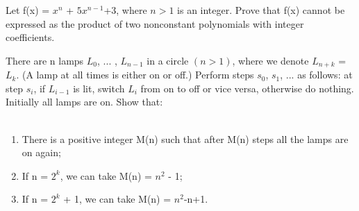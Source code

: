 
\item  Let f(x) = $x^n$ + $5x^{n-1}$+3, where $n>1$ is an integer. Prove that f(x)
cannot be expressed as the product of two nonconstant polynomials
with integer coefficients.

\item  There are n lamps $L_0$, ... , $L_{n-1}$ in a circle $(n>1)$, where we denote $L_{n+k}$ = $L_k$. (A lamp at all times is either on or off.) Perform steps $s_0$, $s_1$, ... as follows: at step $s_i$, if $L_{i-1}$ is lit, switch $L_i$
from on to off or
vice versa, otherwise do nothing. Initially all lamps are on. Show that:\\
\\ \begin{enumerate}
\item There is a positive integer M(n) such that after M(n) steps all the lamps are on again;
\item If n = $2^k$, we can take M(n) = $n^2$ - 1;
\item If n = $2^k$ + 1, we can take M(n) = $n^2$-n+1.
\end{enumerate}



